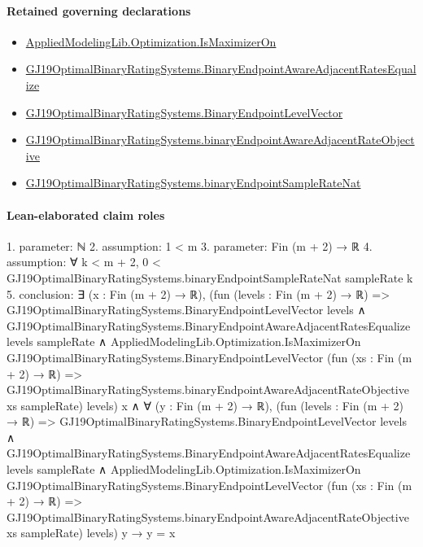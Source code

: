 \documentclass[10pt]{article}
\begin{document}
\paragraph{Retained governing declarations}
\begin{itemize}\raggedright
\item \hyperlink{governing-declaration-67616b2feb727132}{Applied\allowbreak{}Modeling\allowbreak{}Lib.\allowbreak{}Optimization.\allowbreak{}Is\allowbreak{}Maximizer\allowbreak{}On}
\item \hyperlink{governing-declaration-5a62c276eedad684}{GJ19\allowbreak{}Optimal\allowbreak{}Binary\allowbreak{}Rating\allowbreak{}Systems.\allowbreak{}Binary\allowbreak{}Endpoint\allowbreak{}Aware\allowbreak{}Adjacent\allowbreak{}Rates\allowbreak{}Equalize}
\item \hyperlink{governing-declaration-aa797f827cdcda67}{GJ19\allowbreak{}Optimal\allowbreak{}Binary\allowbreak{}Rating\allowbreak{}Systems.\allowbreak{}Binary\allowbreak{}Endpoint\allowbreak{}Level\allowbreak{}Vector}
\item \hyperlink{governing-declaration-90a6fa979204b5b7}{GJ19\allowbreak{}Optimal\allowbreak{}Binary\allowbreak{}Rating\allowbreak{}Systems.\allowbreak{}binary\allowbreak{}Endpoint\allowbreak{}Aware\allowbreak{}Adjacent\allowbreak{}Rate\allowbreak{}Objective}
\item \hyperlink{governing-declaration-314de672bb90c1dd}{GJ19\allowbreak{}Optimal\allowbreak{}Binary\allowbreak{}Rating\allowbreak{}Systems.\allowbreak{}binary\allowbreak{}Endpoint\allowbreak{}Sample\allowbreak{}Rate\allowbreak{}Nat}
\end{itemize}
\paragraph{Lean-elaborated claim roles}\begin{ReviewVerbatim}
1. parameter: ℕ
2. assumption: 1 < m
3. parameter: Fin (m + 2) → ℝ
4. assumption: ∀ k < m + 2, 0 < GJ19OptimalBinaryRatingSystems.binaryEndpointSampleRateNat sampleRate k
5. conclusion: ∃ (x : Fin (m + 2) → ℝ),
  (fun (levels : Fin (m + 2) → ℝ) =>
        GJ19OptimalBinaryRatingSystems.BinaryEndpointLevelVector levels ∧
          GJ19OptimalBinaryRatingSystems.BinaryEndpointAwareAdjacentRatesEqualize levels sampleRate ∧
            AppliedModelingLib.Optimization.IsMaximizerOn GJ19OptimalBinaryRatingSystems.BinaryEndpointLevelVector
              (fun (xs : Fin (m + 2) → ℝ) =>
                GJ19OptimalBinaryRatingSystems.binaryEndpointAwareAdjacentRateObjective xs sampleRate)
              levels)
      x ∧
    ∀ (y : Fin (m + 2) → ℝ),
      (fun (levels : Fin (m + 2) → ℝ) =>
            GJ19OptimalBinaryRatingSystems.BinaryEndpointLevelVector levels ∧
              GJ19OptimalBinaryRatingSystems.BinaryEndpointAwareAdjacentRatesEqualize levels sampleRate ∧
                AppliedModelingLib.Optimization.IsMaximizerOn GJ19OptimalBinaryRatingSystems.BinaryEndpointLevelVector
                  (fun (xs : Fin (m + 2) → ℝ) =>
                    GJ19OptimalBinaryRatingSystems.binaryEndpointAwareAdjacentRateObjective xs sampleRate)
                  levels)
          y →
        y = x
\end{ReviewVerbatim}
\end{document}
